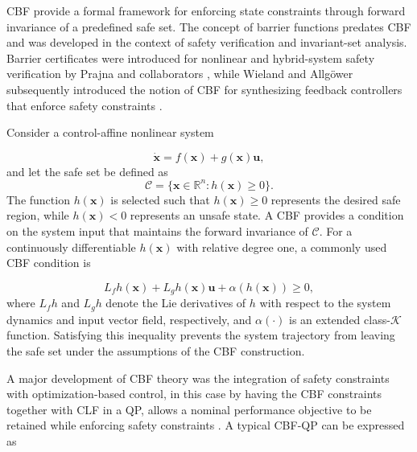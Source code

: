 \gls{CBF} provide a formal framework for enforcing state constraints through forward invariance of a predefined safe set. The concept of barrier functions predates \gls{CBF} and was developed in the context of safety verification and invariant-set analysis. Barrier certificates were introduced for nonlinear and hybrid-system safety verification by Prajna and collaborators \cite{prajnaSafetyVerificationHybrid2004}, while Wieland and Allgöwer subsequently introduced the notion of \gls{CBF} for synthesizing feedback controllers that enforce safety constraints \cite{wielandCONSTRUCTIVESAFETYUSING2007}.

Consider a control-affine nonlinear system

\begin{equation}
\dot{\mathbf{x}}=f(\mathbf{x})+g(\mathbf{x})\mathbf{u},
\end{equation}
and let the safe set be defined as
\begin{equation}
\mathcal{C}=\{\mathbf{x}\in\mathbb{R}^n:h(\mathbf{x})\geq0\}.
\end{equation}
The function $h(\mathbf{x})$ is selected such that $h(\mathbf{x})\geq0$ represents the desired safe region, while $h(\mathbf{x})<0$ represents an unsafe state. A \gls{CBF} provides a condition on the system input that maintains the forward invariance of $\mathcal{C}$. For a continuously differentiable $h(\mathbf{x})$ with relative degree one, a commonly used \gls{CBF} condition is

\begin{equation}
L_fh(\mathbf{x})+L_gh(\mathbf{x})\mathbf{u}+\alpha(h(\mathbf{x}))\geq0,
\end{equation}
where $L_fh$ and $L_gh$ denote the Lie derivatives of $h$ with respect to the system dynamics and input vector field, respectively, and \(\alpha(\cdot)\) is an extended class-$\mathcal{K}$ function. Satisfying this inequality prevents the system trajectory from leaving the safe set under the assumptions of the \gls{CBF} construction.

A major development of \gls{CBF} theory was the integration of safety constraints with optimization-based control, in this case by having the \gls{CBF} constraints together with \gls{CLF} in a \gls{QP}, allows a nominal performance objective to be retained while enforcing safety constraints \cite{amesControlBarrierFunction2017b}. A typical CBF-QP can be expressed as

